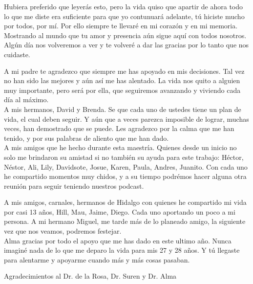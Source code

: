 
Hubiera preferido que leyerás esto, pero la vida quiso que apartir de ahora todo lo que me diste era suficiente para que yo contunuará adelante, tú hiciste mucho por todos, por mí. Por ello siempre te llevaré en mi corazón y en mi memoria. Mostrando al mundo que tu amor y presencia aún sigue aquí con todos nosotros. Algún día nos volveremos a ver y te volveré a dar las gracias por lo tanto que nos cuidaste.

A mi padre te agradezco que siempre me has apoyado en mis decisiones. Tal vez no han sido las mejores y aún así me has alentado. La vida nos quito a alguien muy importante, pero será por ella, que seguiremos avanzando y viviendo cada día al máximo.
\\
A mis hermanos, David y Brenda. Se que cada uno de ustedes tiene un plan de vida, el cual deben seguir. Y aún que a veces parezca imposible de lograr, muchas veces, han demostrado que se puede. Les agradezco por la calma que me han tenido, y por sus palabras de aliento que me han dado.
\\
A mis amigos que he hecho durante esta maestría. Quienes desde un inicio no solo me brindaron su amistad si no también su ayuda para este trabajo: Héctor, Néstor, Ali, Lily, Davidsote, Josue, Karen, Paula, Andres, Juanito. Con cada uno he compartido momentos muy chidos, y a su tiempo podrémos hacer alguna otra reunión para seguir teniendo nuestros podcast.

A mis amigos, carnales, hermanos de Hidalgo con quienes he compartido mi vida por casi 13 años, Hill, Mau, Jaime, Diego. Cada uno aportando un poco a mi persona. A mi hermano Miguel, me tarde más de lo planeado amigo, la siguiente vez que nos veamos, podremos festejar.
\\
Alma gracias por todo el apoyo que me has dado en este ultimo año. Nunca imaginé nada de lo que me deparo la vida para mis 27 y 28 años. Y tú llegaste para alentarme y apoyarme cuando más y más cosas pasaban. 

Agradecimientos al Dr. de la Rosa, Dr. Suren y Dr. Alma